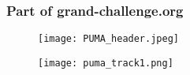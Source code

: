 \documentclass[../main.tex]{subfiles}
\begin{document}
\frame{\titlepage}

\begin{frame}
    \frametitle{Part of grand-challenge.org}

    \begin{figure}[h]
        \centering
        \texttt{[image: PUMA\_header.jpeg]}
    \end{figure}

    \begin{figure}[h]
        \centering
        \texttt{[image: puma\_track1.png]}
    \end{figure}
\end{frame}
\end{document}
